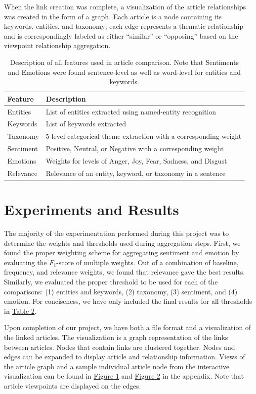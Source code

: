 \documentclass[12pt]{article}
\begin{document}
When the link creation was complete, a visualization of the article relationships was created in the form of a graph. Each article is a node containing its keywords, entities, and taxonomy; each edge represents a thematic relationship and is correspondingly labeled as either ``similar'' or ``opposing'' based on the viewpoint relationship aggregation.

\begin{table}
	\begin{tabular}{|l|l|}\hline
		Feature & Description\\\hline
		Entities & List of entities extracted using named-entity recognition\\
		Keywords & List of keywords extracted\\
		Taxonomy & 5-level categorical theme extraction with a corresponding weight\\
		Sentiment & Positive, Neutral, or Negative with a corresponding weight\\
		Emotions & Weights for levels of Anger, Joy, Fear, Sadness, and Disgust\\
		Relevance & Relevance of an entity, keyword, or taxonomy in a sentence\\\hline
	\end{tabular}
	\caption{Description of all features used in article comparison. Note that Sentiments and Emotions were found sentence-level as well as word-level for entities and keywords.}
	\label{table:features}
\end{table}

\section{Experiments and Results}
The majority of the experimentation performed during this project was to determine the weights and thresholds used during aggregation steps. First, we found the proper weighting scheme for aggregating sentiment and emotion by evaluating the $F_1$-score of multiple weights. Out of a combination of baseline, frequency, and relevance weights, we found that relevance gave the best results. Similarly, we evaluated the proper threshold to be used for each of the comparisons: (1) entities and keywords, (2) taxonomy, (3) sentiment, and (4) emotion. For conciseness, we have only included the final results for all thresholds in \hyperref[table:thresholds]{Table 2}.

Upon completion of our project, we have both a file format and a visualization of the linked articles. The visualization is a graph representation of the links between articles. Nodes that contain links are clustered together. Nodes and edges can be expanded to display article and relationship information. Views of the article graph and a sample individual article node from the interactive visualization can be found in \hyperref[fig:graph]{Figure 1} and \hyperref[fig:graphNode]{Figure 2} in the appendix. Note that article viewpoints are displayed on the edges.
\end{document}

